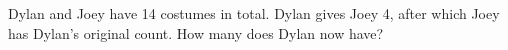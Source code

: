 Dylan and Joey have 14 costumes in total. Dylan gives Joey 4, after which Joey has Dylan's original count. How many does Dylan now have?
